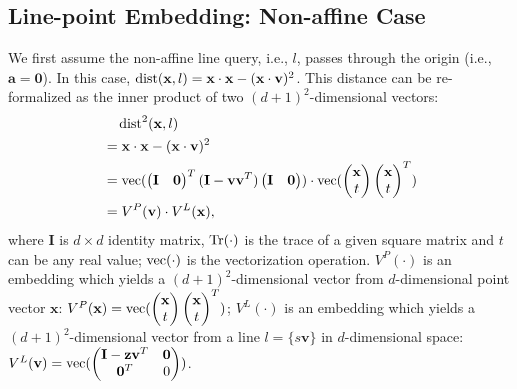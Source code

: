 \subsection{Line-point Embedding: Non-affine Case}
\label{subsubsec:3:embed}
We first assume the non-affine line query, i.e., $l$, passes through the origin (i.e., $\mathbf a = \mathbf 0$). In this case, $\operatorname{dist}(\mathbf x, l) = \mathbf x \cdot \mathbf x - (\mathbf x \cdot \mathbf v)^2$. This distance can be re-formalized as the inner product of two $(d+1)^2$-dimensional vectors:
\begin{align}
  \label{eq:3:dist}
  &\quad{} \operatorname{dist}^2(\mathbf x, l) \notag \\
  &= \mathbf x \cdot \mathbf x - (\mathbf x \cdot \mathbf v)^2 \notag \\
  &= \operatorname{vec}(\begin{pmatrix} \mathbf I & \mathbf 0 \end{pmatrix}^T (\mathbf I - \mathbf v \mathbf v^T) \begin{pmatrix} \mathbf I & \mathbf 0 \end{pmatrix}) \cdot \operatorname{vec}(\begin{pmatrix} \mathbf x \\ t \end{pmatrix} \begin{pmatrix} \mathbf x \\ t \end{pmatrix}^T) \\
  &= V^P(\mathbf v) \cdot V^L(\mathbf x), \notag
\end{align}
where $\mathbf I$ is $d\times d$ identity matrix, $\operatorname{Tr}(\cdot)$ is the trace of a given square matrix and $t$ can be any real value; $\operatorname{vec}(\cdot)$ is the vectorization operation. $V^P(\cdot)$ is an embedding which yields a $(d+1)^2$-dimensional vector from $d$-dimensional point vector $\mathbf x$: $V^P(\mathbf x) =
\operatorname{vec}(\begin{pmatrix} \mathbf x \\ t \end{pmatrix} \begin{pmatrix} \mathbf x \\ t \end{pmatrix}^T)$; $V^L(\cdot)$ is an embedding which yields a $(d+1)^2$-dimensional vector from a line $l = \{s \mathbf v\}$ in $d$-dimensional space: $V^L(\mathbf v) = \operatorname{vec}(\begin{pmatrix} \mathbf I - \mathbf z \mathbf v^T & \mathbf 0 \\ \mathbf 0^T & 0 \end{pmatrix})$.

